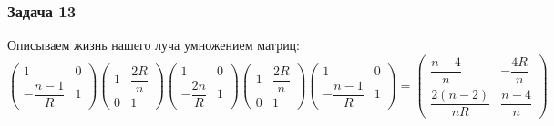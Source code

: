 \subsubsection*{Задача 13}
Описываем жизнь нашего  луча умножением матриц:
\begin{equation*}
	\begin{pmatrix}
		1 & 0 \\ -\dfrac{n-1}{R} & 1
	\end{pmatrix}
	\begin{pmatrix}
		1 & \dfrac{2R}{n} \\ 0 & 1
	\end{pmatrix}
	\begin{pmatrix}
		1 & 0 \\ -\dfrac{2n}{R} & 1
	\end{pmatrix}
	\begin{pmatrix}
		1 & \dfrac{2 R}{n} \\ 0 & 1
	\end{pmatrix}
	\begin{pmatrix}
		1 & 0 \\ -\dfrac{n-1}{R} & 1
	\end{pmatrix}
	= 
	\begin{pmatrix}
		\dfrac{n-4}{n} & -\dfrac{4 R}{n} \\ \dfrac{2(n-2)}{n R} & \dfrac{n-4}{n}
	\end{pmatrix}
\end{equation*}

